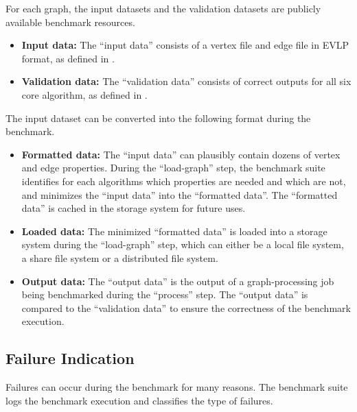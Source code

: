 For each graph, the input datasets and the validation datasets are publicly available benchmark resources.

\begin{itemize} 
    \item \textbf{Input data:} The ``input data'' consists of a vertex file and edge file in EVLP format, as defined in .
    \item \textbf{Validation data:} The ``validation data'' consists of correct outputs for all six core algorithm, as defined in .
\end{itemize}

The input dataset can be converted into the following format during the benchmark.

\begin{itemize}
    \item \textbf{Formatted data:} The ``input data'' can plausibly contain dozens of vertex and edge properties. During the ``load-graph'' step, the benchmark suite identifies for each algorithms which properties are needed and which are not, and minimizes the ``input data'' into the ``formatted data''. The ``formatted data'' is cached in the storage system for future uses. 
    \item \textbf{Loaded data:} The minimized ``formatted data'' is loaded into a storage system during the ``load-graph'' step, which can either be a local file system, a share file system or a distributed file system.
    \item \textbf{Output data:} The ``output data'' is the output of a graph-processing job being benchmarked during the ``process'' step. The ``output data'' is compared to the ``validation data'' to ensure the correctness of the benchmark execution.
\end{itemize}



\subsection{Failure Indication}
\label{sec:process:execution:failure}
Failures can occur during the benchmark for many reasons. The benchmark suite logs the benchmark execution and classifies the type of failures.


